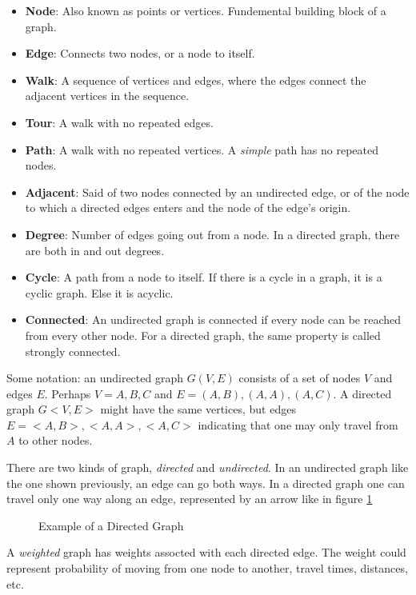 \begin{itemize}
    \item \textbf{Node}: Also known as points or vertices. Fundemental
          building block of a graph.
    \item \textbf{Edge}: Connects two nodes, or a node to itself.
    \item \textbf{Walk}: A sequence of vertices and edges, where the edges connect the adjacent vertices in the sequence.
    \item \textbf{Tour}: A walk with no repeated edges.
    \item \textbf{Path}: A walk with no repeated vertices. A \emph{simple} path has no repeated nodes.
    \item \textbf{Adjacent}: Said of two nodes connected by an undirected edge,
          or of the node to which a directed edges enters and the node of the edge's origin.
    \item \textbf{Degree}: Number of edges going out from a node. In a directed graph,
          there are both in and out degrees.
    \item \textbf{Cycle}: A path from a node to itself. If there is a cycle in a
          graph, it is a cyclic graph. Else it is acyclic.
    \item \textbf{Connected}: An undirected graph is connected if every node can be reached
          from every other node. For a directed graph, the same property is called strongly connected.
\end{itemize}

Some notation: an undirected graph $G(V,E)$ consists of a set of nodes $V$
and edges $E$. Perhaps $V = {A, B, C}$ and $E = {(A,B), (A,A), (A, C)}$.
A directed graph $G<V, E>$ might have the same vertices, but edges
$E = {<A,B>, <A,A>, <A, C>}$ indicating that one may only travel from $A$
to other nodes.

There are two kinds of graph, \emph{directed} and \emph{undirected}.
In an undirected graph like the one shown previously, an edge can
go both ways. In a directed graph one can travel only one way along an
edge, represented by an arrow like in figure \ref{fig:directedgraph}

\begin{figure}
    \caption{Example of a Directed Graph}
    \label{fig:directedgraph}
\end{figure}

A \emph{weighted} graph has weights assocted with each directed edge. The weight
could represent probability of moving from one node to another, travel times, distances,
etc.